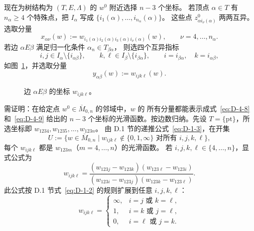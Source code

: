 现在为树结构为 $(T,E,\Lambda)$ 的 $w^0$ 附近选择 $n-3$ 个坐标。
若顶点 $\alpha\in T$ 有 $n_\alpha\ge4$ 个特殊点，把
$I_\alpha$ 写成 $\{i_1(\alpha),\ldots,i_{n_\alpha}(\alpha)\}$。
这些点 $z^0_{\alpha i_\nu(\alpha)}$ 两两互异。选取分量
\begin{equation}\label{eq:D-4-8}
  x_{\alpha\nu}(w):=
  w_{i_1(\alpha)i_2(\alpha)i_3(\alpha)i_\nu(\alpha)}(w),
  \qquad\nu=4,\ldots,n_\alpha.
\end{equation}
若边 $\alpha E\beta$ 满足归一化条件 $\alpha_n\in T_{\beta\alpha}$，
则选四个互异指标
\[
  i,j\in I_\alpha\setminus\{i_{\alpha\beta}\},\qquad
  k,\ell\in I_\beta\setminus\{i_{\beta\alpha}\},\qquad
  i=i_{\beta\alpha},\quad k=i_{\alpha\beta},
\]
如图~\ref{fig:D-4-5}，并选取分量
\begin{equation}\label{eq:D-4-9}
  y_{\alpha\beta}(w):=w_{ijk\ell}(w).
\end{equation}

\begin{figure}[htbp]
  \centering
  \caption{边 $\alpha E\beta$ 的坐标 $w_{ijk\ell}$。}
  \label{fig:D-4-5}
\end{figure}

需证明：在给定点 $w^0\in\overline M_{0,n}$ 的邻域中，$w$ 的
所有分量都能表示成式~\eqref{eq:D-4-8} 和~\eqref{eq:D-4-9}
给出的 $n-3$ 个坐标的光滑函数。按边数归纳。先设
$T=\{\mathrm{pt}\}$，所选坐标即
$w_{1234},w_{1235},\ldots,w_{123n}$。
由 D.1 节的递推公式~\eqref{eq:D-1-3}，在开集
\[
  U:=\{w\in\overline M_{0,n}\mid
  w_{ijk\ell}\notin\{0,1,\infty\}\text{ 对所有 }i,j,k,\ell\},
\]
每个 $w_{ijk\ell}$ 都是 $w_{123m}$（$m=4,\ldots,n$）的光滑函数。
若 $i,j,k,\ell\in\{4,\ldots,n\}$，显式公式为
\[
  w_{ijk\ell}=
  \frac{(w_{123j}-w_{123k})(w_{123\ell}-w_{123i})}
  {(w_{123i}-w_{123j})(w_{123k}-w_{123\ell})}.
\]
此公式按 D.1 节式~\eqref{eq:D-1-2} 的规则扩展到任意
$i,j,k,\ell$：
\[
  w_{ijk\ell}=\begin{cases}
    \infty,&i=j\text{ 或 }k=\ell,\\
    1,&i=k\text{ 或 }j=\ell,\\
    0,&i=\ell\text{ 或 }j=k.
  \end{cases}
\]

